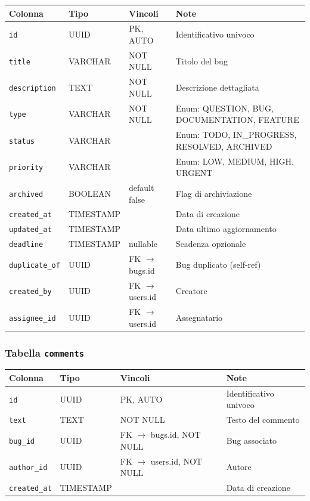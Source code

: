 ﻿\documentclass[a4paper,11pt]{article}
\begin{document}
\begin{tabular}{|l|l|l|p{5cm}|}
\hline
\textbf{Colonna} & \textbf{Tipo} & \textbf{Vincoli} & \textbf{Note} \\
\hline
\texttt{id} & UUID & PK, AUTO & Identificativo univoco \\
\hline
\texttt{title} & VARCHAR & NOT NULL & Titolo del bug \\
\hline
\texttt{description} & TEXT & NOT NULL & Descrizione dettagliata \\
\hline
\texttt{type} & VARCHAR & NOT NULL & Enum: QUESTION, BUG, DOCUMENTATION, FEATURE \\
\hline
\texttt{status} & VARCHAR & & Enum: TODO, IN\_PROGRESS, RESOLVED, ARCHIVED \\
\hline
\texttt{priority} & VARCHAR & & Enum: LOW, MEDIUM, HIGH, URGENT \\
\hline
\texttt{archived} & BOOLEAN & default false & Flag di archiviazione \\
\hline
\texttt{created\_at} & TIMESTAMP & & Data di creazione \\
\hline
\texttt{updated\_at} & TIMESTAMP & & Data ultimo aggiornamento \\
\hline
\texttt{deadline} & TIMESTAMP & nullable & Scadenza opzionale \\
\hline
\texttt{duplicate\_of} & UUID & FK $\to$ bugs.id & Bug duplicato (self-ref) \\
\hline
\texttt{created\_by} & UUID & FK $\to$ users.id & Creatore \\
\hline
\texttt{assignee\_id} & UUID & FK $\to$ users.id & Assegnatario \\
\hline
\end{tabular}

\subsubsection{Tabella \texttt{comments}}

\begin{tabular}{|l|l|l|p{5cm}|}
\hline
\textbf{Colonna} & \textbf{Tipo} & \textbf{Vincoli} & \textbf{Note} \\
\hline
\texttt{id} & UUID & PK, AUTO & Identificativo univoco \\
\hline
\texttt{text} & TEXT & NOT NULL & Testo del commento \\
\hline
\texttt{bug\_id} & UUID & FK $\to$ bugs.id, NOT NULL & Bug associato \\
\hline
\texttt{author\_id} & UUID & FK $\to$ users.id, NOT NULL & Autore \\
\hline
\texttt{created\_at} & TIMESTAMP & & Data di creazione \\
\hline
\end{tabular}
\end{document}
